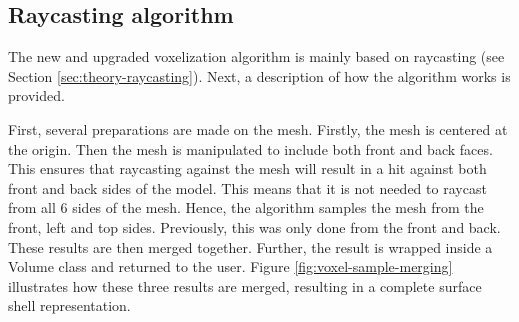 \subsection{Raycasting algorithm}
\label{sec:method-raycasting-algorithm}
The new and upgraded voxelization algorithm is mainly based on raycasting (see Section \ref{sec:theory-raycasting}). Next, a description of how the algorithm works is provided.

First, several preparations are made on the mesh. Firstly, the mesh is centered at the origin. Then the mesh is manipulated to include both front and back faces. This ensures that raycasting against the mesh will result in a hit against both front and back sides of the model. This means that it is not needed to raycast from all 6 sides of the mesh. Hence, the algorithm samples the mesh from the front, left and top sides. Previously, this was only done from the front and back. These results are then merged together. Further, the result is wrapped inside a Volume class and returned to the user. Figure \ref{fig:voxel-sample-merging} illustrates how these three results are merged, resulting in a complete surface shell representation.
